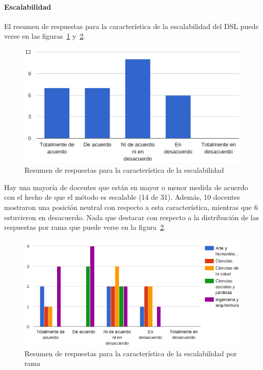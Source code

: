 \newpage
\paragraph*{Escalabilidad}

El resumen de respuestas para la característica de la escalabilidad del DSL puede verse en las figuras~\ref{fig:evalmetodo:dsl:escalabilidad} y~\ref{fig:evalmetodo:dsl:escalabilidad:rama}.

\begin{figure}[h]
  \begin{center}
    \includegraphics[scale=0.5]{C_DSL_escalabilidad.png}
  \end{center}
  \caption{Resumen de respuestas para la característica de la escalabilidad}
  \label{fig:evalmetodo:dsl:escalabilidad}
\end{figure}

Hay una mayoría de docentes que están en mayor o menor medida de acuerdo con el hecho de que el método es escalable (14 de 31). Además, 10 docentes mostraron una posición neutral con respecto a esta característica, mientras que 6 estuvieron en desacuerdo. Nada que destacar con respecto a la distribución de las respuestas por rama que puede verse en la figura~\ref{fig:evalmetodo:dsl:escalabilidad:rama}.

\begin{figure}[h]
  \begin{center}
    \includegraphics[scale=0.5]{C_DSL_escalabilidad_rama.png}
  \end{center}
  \caption{Resumen de respuestas para la característica de la escalabilidad por rama}
  \label{fig:evalmetodo:dsl:escalabilidad:rama}
\end{figure}

